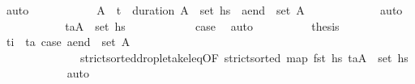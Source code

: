 \begin{isabellebody}
\ auto\isanewline
\ \ \ \ \ \ \ \ \isamarkupfalse%
\ \isamarkupfalse%
\ A{\isacharprime}{\kern0pt}\ \ {\isachardoublequoteopen}{\isacharparenleft}{\kern0pt}t\isactrlsub {\isasympi}\ {\isacharplus}{\kern0pt}\ {\isacharparenleft}{\kern0pt}duration\ {\isasympi}{\isacharparenright}{\kern0pt}{\isacharcomma}{\kern0pt}A{\isacharprime}{\kern0pt}{\isacharparenright}{\kern0pt}\ {\isasymin}\ set\ hs\ \ {\isachardoublequoteopen}{\isacharquery}{\kern0pt}a\isactrlsub e\isactrlsub n\isactrlsub d\ {\isasymin}\ set\ A{\isacharprime}{\kern0pt}{\isachardoublequoteclose}\ \isanewline
\ \ \ \ \ \ \ \ \ \ \isamarkupfalse%
\ auto\isanewline
\ \ \ \ \ \ \ \ \isamarkupfalse%
\ \isamarkupfalse%
\ {\isachardoublequoteopen}{\isacharparenleft}{\kern0pt}t\isactrlsub a{\isacharcomma}{\kern0pt}A{\isacharprime}{\kern0pt}{\isacharparenright}{\kern0pt}\ {\isasymin}\ set\ hs\isanewline
\ \ \ \ \ \ \ \ \ \ \isamarkupfalse%
\ {\isacartoucheopen}{\isacharquery}{\kern0pt}case{}{\isacartoucheclose}\ \isamarkupfalse%
\ auto\isanewline
\ \ \ \ \ \ \ \ \isamarkupfalse%
\ {\isacharquery}{\kern0pt}thesis\isanewline
\ \ \ \ \ \ \ \ \ \ \isamarkupfalse%
\ {\isacartoucheopen}t\isactrlsub i\ {\isacharequal}{\kern0pt}\ t\isactrlsub a{\isacartoucheclose}\ {\isacartoucheopen}{\isacharquery}{\kern0pt}case{}{\isacartoucheclose}\ {\isacartoucheopen}{\isacharquery}{\kern0pt}a\isactrlsub e\isactrlsub n\isactrlsub d\ {\isasymin}\ set\ A{\isacharprime}{\kern0pt}{\isacartoucheclose}\isanewline
\ \ \ \ \ \ \ \ \ \ \ \ \ \ strict{\isacharunderscore}{\kern0pt}sorted{\isacharunderscore}{\kern0pt}drop{\isacharunderscore}{\kern0pt}le{\isacharunderscore}{\kern0pt}take{\isacharunderscore}{\kern0pt}leq{\isacharbrackleft}{\kern0pt}OF\ {\isacartoucheopen}strict{\isacharunderscore}{\kern0pt}sorted\ {\isacharparenleft}{\kern0pt}map\ fst\ hs\ {\isacartoucheopen}{\isacharparenleft}{\kern0pt}t\isactrlsub a{\isacharcomma}{\kern0pt}A{\isacharprime}{\kern0pt}{\isacharparenright}{\kern0pt}\ {\isasymin}\ set\ hs\isanewline
\ \ \ \ \ \ \ \ \ \ \isamarkupfalse%
\ auto\isanewline
\ \ \ \ \ \ \isamarkupfalse%

\end{isabellebody}
